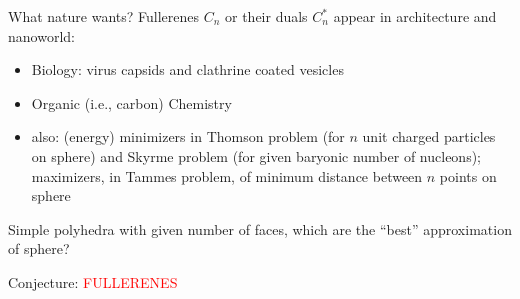 \documentclass[%
pdf,
colorBG,
slideColor,
]{prosper}
\begin{document}
\begin{slide}{What nature wants?}
Fullerenes $C_n$ or their duals $C_n^*$ appear in architecture and nanoworld:
\begin{itemize}
\item Biology: virus capsids and clathrine coated vesicles
\item Organic (i.e., carbon) Chemistry
\item also: (energy) minimizers in Thomson problem (for 
$n$ unit charged particles on sphere) and Skyrme problem (for 
given 
baryonic number of nucleons); maximizers, in Tammes problem,
of minimum distance between $n$ points on sphere
\end{itemize}
Simple polyhedra with given number of faces, which are the ``best''
approximation of sphere?


\begin{center}
Conjecture: \textcolor{red}{FULLERENES}
\end{center}
\end{slide}


\end{document}
